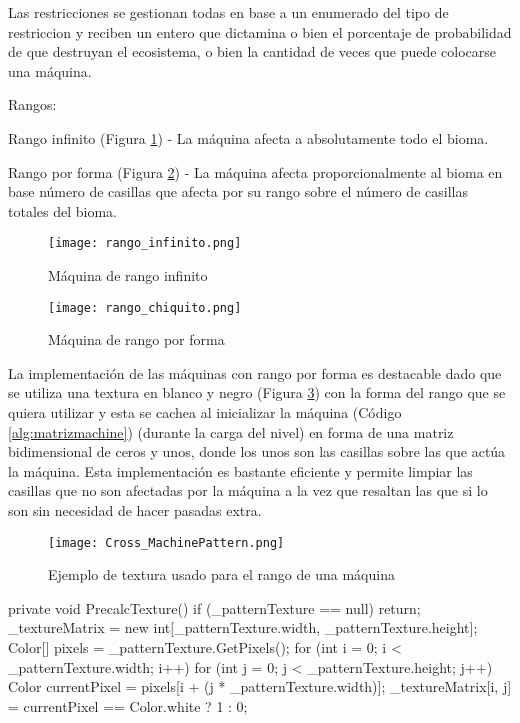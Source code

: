 Las restricciones se gestionan todas en base a un enumerado del tipo de restriccion y reciben un entero que dictamina o bien el porcentaje de probabilidad de que destruyan el ecosistema, o bien la cantidad de veces que puede colocarse una máquina.

Rangos:
\begin{compactitem}
    \item Rango infinito (Figura \ref{fig:rango_inf}) - La máquina afecta a absolutamente todo el bioma.
    \item Rango por forma (Figura \ref{fig:rango_form}) - La máquina afecta proporcionalmente al bioma en base número de casillas que afecta por su rango sobre el número de casillas totales del bioma.
\end{compactitem}

\begin{figure}[H]
    \centering
      \texttt{[image: rango\_infinito.png]}
    \caption{Máquina de rango infinito}
    \label{fig:rango_inf}
  \end{figure}

  \begin{figure}[H]
    \centering
      \texttt{[image: rango\_chiquito.png]}
    \caption{Máquina de rango por forma}
    \label{fig:rango_form}
  \end{figure}

La implementación de las máquinas con rango por forma es destacable dado que se utiliza una textura en blanco y negro (Figura \ref{fig:rango_pattern}) con la forma del rango que se quiera utilizar y esta se cachea al inicializar la máquina (Código \ref{alg:matrizmachine}) (durante la carga del nivel) en forma de una matriz bidimensional de ceros y unos, donde los unos son las casillas sobre las que actúa la máquina.
Esta implementación es bastante eficiente y permite limpiar las casillas que no son afectadas por la máquina a la vez que resaltan las que si lo son sin necesidad de hacer pasadas extra.

\begin{figure}[H]
    \centering
      \texttt{[image: Cross\_MachinePattern.png]}
    \caption{Ejemplo de textura usado para el rango de una máquina}
    \label{fig:rango_pattern}
  \end{figure}

\begin{mypython}[caption={Código para cachear la matríz del rango de una máquina.},label={alg:matrizmachine}]
private void PrecalcTexture() 
{
    if (_patternTexture == null) return;
    _textureMatrix = new int[_patternTexture.width, _patternTexture.height];
    Color[] pixels = _patternTexture.GetPixels();
    for (int i = 0; i < _patternTexture.width; i++) 
    {
        for (int j = 0; j < _patternTexture.height; j++) 
        {
            Color currentPixel = pixels[i + (j * _patternTexture.width)];
            _textureMatrix[i, j] = currentPixel == Color.white ? 1 : 0;
        }
    }
}
\end{mypython}

